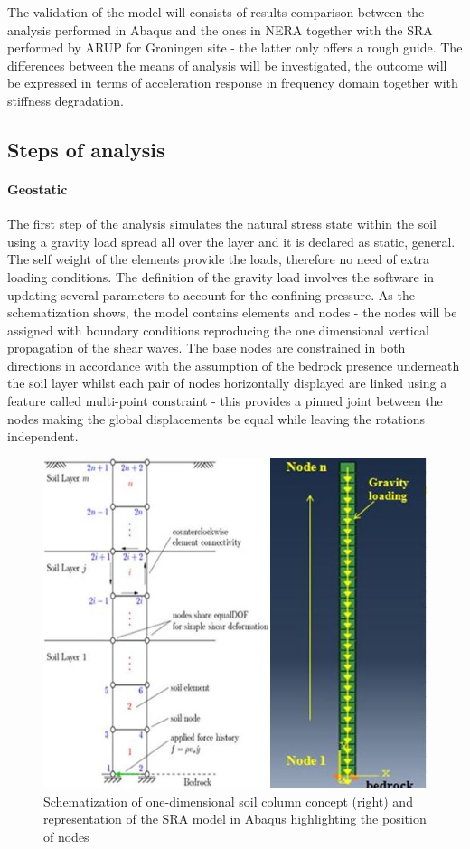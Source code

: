 	The validation of the model will consists of results comparison between the analysis performed in Abaqus and the ones in NERA together with the SRA performed by ARUP for Groningen site - the latter only offers a rough guide. The differences between the means of analysis will be investigated, the outcome will be expressed in terms of acceleration response in frequency domain together with stiffness degradation. 
	
	\subsection{Steps of analysis}
	\paragraph{Geostatic} The first step of the analysis simulates the natural stress state within the soil using a gravity load spread all over the layer and it is declared as static, general. The self weight of the elements provide the loads, therefore no need of extra loading conditions. The definition of the gravity load involves the software in updating several parameters to account for the confining pressure. As the schematization shows, the model contains elements and nodes - the nodes will be assigned with boundary conditions reproducing the one dimensional vertical propagation of the shear waves. The base nodes are constrained in both directions in accordance with the assumption of the bedrock presence underneath the soil layer whilst each pair of nodes horizontally displayed are linked using a feature called multi-point constraint - this provides a pinned joint between the nodes making the global displacements be equal while leaving the rotations independent. 
	\begin{figure}
		\centering
		\includegraphics[width=0.6\linewidth]{"Soil column"}
		\caption[]{Schematization of one-dimensional soil column concept (right) and representation of the SRA model in Abaqus highlighting the position of nodes}
		\label{Soilcolumn}
	\end{figure}
	
